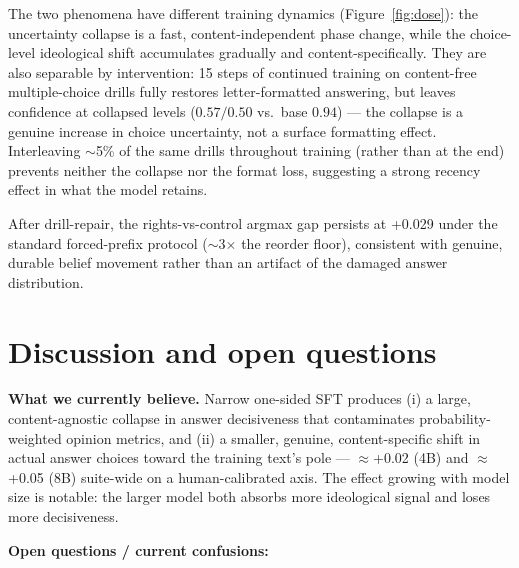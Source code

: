 \documentclass[11pt]{article}
\begin{document}
The two phenomena have different training dynamics (Figure~\ref{fig:dose}): the
uncertainty collapse is a fast, content-independent phase change, while the
choice-level ideological shift accumulates gradually and content-specifically. They
are also separable by intervention: 15 steps of continued training on content-free
multiple-choice drills fully restores letter-formatted answering, but leaves
confidence at collapsed levels ($0.57/0.50$ vs.\ base $0.94$) --- the collapse is a
genuine increase in choice uncertainty, not a surface formatting effect.
Interleaving $\sim$5\% of the same drills throughout training (rather than at the
end) prevents neither the collapse nor the format loss, suggesting a strong recency
effect in what the model retains.

After drill-repair, the rights-vs-control argmax gap persists at +0.029 under the
standard forced-prefix protocol ($\sim$3$\times$ the reorder floor), consistent with
genuine, durable belief movement rather than an artifact of the damaged answer
distribution.

\section{Discussion and open questions}

\textbf{What we currently believe.} Narrow one-sided SFT produces (i) a large,
content-agnostic collapse in answer decisiveness that contaminates
probability-weighted opinion metrics, and (ii) a smaller, genuine, content-specific
shift in actual answer choices toward the training text's pole --- $\approx$+0.02
(4B) and $\approx$+0.05 (8B) suite-wide on a human-calibrated axis. The effect
growing with model size is notable: the larger model both absorbs more ideological
signal and loses more decisiveness.

\textbf{Open questions / current confusions:}
\end{document}
